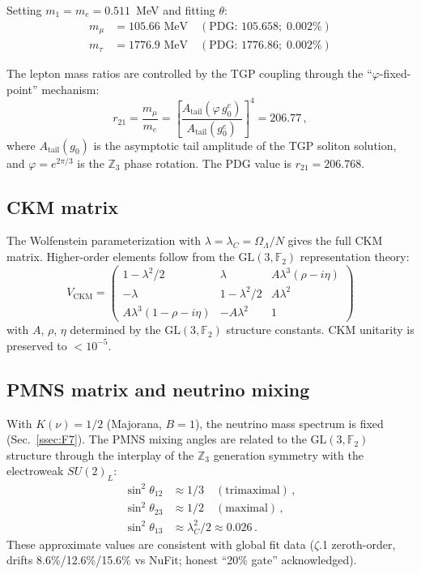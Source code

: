 \documentclass[aps,prd,twocolumn,superscriptaddress,showpacs,
  nofootinbib,floatfix,longbibliography]{revtex4-2}
\newcommand{\gone}{{g_0^e}}
\newcommand{\OL}{\Omega_\Lambda}
\newcommand{\GL}{\mathrm{GL}(3,\mathbb{F}_2)}
\newcommand{\ZZ}{\mathbb{Z}}
\begin{document}
Setting $m_1 = m_e = 0.511$~MeV and fitting $\theta$:
\begin{align}
  m_\mu &= 105.66 \text{ MeV} \quad (\text{PDG: } 105.658; \; 0.002\%) \\
  m_\tau &= 1776.9 \text{ MeV} \quad (\text{PDG: } 1776.86; \; 0.002\%)
\end{align}

The lepton mass ratios are controlled by the TGP coupling
through the ``$\varphi$-fixed-point'' mechanism:
\begin{equation}
  r_{21} = \frac{m_\mu}{m_e}
  = \left[\frac{A_\mathrm{tail}(\varphi\,\gone)}{A_\mathrm{tail}(\gone)}\right]^4
  = 206.77\,,
\end{equation}
where $A_\mathrm{tail}(g_0)$ is the asymptotic tail amplitude of the
TGP soliton solution, and $\varphi = e^{2\pi/3}$ is the $\ZZ_3$ phase
rotation. The PDG value is $r_{21} = 206.768$.


\subsection{CKM matrix}\label{ssec:ckm}

The Wolfenstein parameterization with $\lambda = \lambda_C = \OL/N$
gives the full CKM matrix. Higher-order elements follow from the
$\GL$ representation theory:
\begin{equation}
  V_\mathrm{CKM} = \begin{pmatrix}
    1 - \lambda^2/2 & \lambda & A\lambda^3(\rho - i\eta) \\
    -\lambda & 1 - \lambda^2/2 & A\lambda^2 \\
    A\lambda^3(1 - \rho - i\eta) & -A\lambda^2 & 1
  \end{pmatrix}
\end{equation}
with $A$, $\rho$, $\eta$ determined by the $\GL$ structure constants.
CKM unitarity is preserved to $< 10^{-5}$.


\subsection{PMNS matrix and neutrino mixing}\label{ssec:pmns}

With $K(\nu) = 1/2$ (Majorana, $B = 1$), the neutrino mass spectrum
is fixed (Sec.~\ref{ssec:F7}). The PMNS mixing angles are related
to the $\GL$ structure through the interplay of the $\ZZ_3$ generation
symmetry with the electroweak $SU(2)_L$:
\begin{align}
  \sin^2\theta_{12} &\approx 1/3 \quad (\text{trimaximal})\,, \\
  \sin^2\theta_{23} &\approx 1/2 \quad (\text{maximal})\,, \\
  \sin^2\theta_{13} &\approx \lambda_C^2/2 \approx 0.026\,.
\end{align}
These approximate values are consistent with global fit data
($\zeta$.1 zeroth-order, drifts 8.6\%/12.6\%/15.6\% vs NuFit; honest
``20\% gate'' acknowledged).
\end{document}

